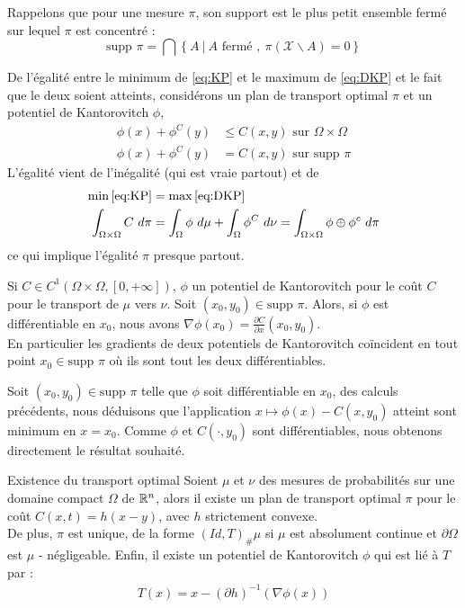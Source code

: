 \documentclass[a4paper,12pt]{article}
\newcommand{\supp}{\text{supp }}
\begin{document}
Rappelons que pour une mesure $\pi$, son support est le plus petit ensemble fermé sur lequel $\pi$ est concentré : 
$$
\supp \pi = \bigcap \left\{A\ |\ A \text{ fermé },\ \pi(\mathcal{X}\backslash A) = 0 \right\}
$$

De l'égalité entre le minimum de \eqref{eq:KP} et le maximum de \eqref{eq:DKP} et le fait que le deux soient atteints, considérons un plan de transport optimal $\pi$ et un potentiel de Kantorovitch $\phi$, 
\begin{align}
\phi(x)+\phi^C(y) &\leq C(x,y) \text{ sur } \Omega\times\Omega \\
\phi(x)+\phi^C(y) &= C(x,y) \text{ sur }\supp\pi
\end{align}
L'égalité vient de l'inégalité (qui est vraie partout) et de 
\begin{align}
\min\eqref{eq:KP} &= \max \eqref{eq:DKP}\nonumber\\
\int_{\Omega\times\Omega} C\ d\pi &= \int_{\Omega}\phi\ d\mu +  \int_{\Omega} \phi^C\ d\nu = \int_{\Omega\times\Omega} \phi\oplus\phi^c\ d\pi
\end{align}
ce qui implique l'égalité $\pi$ presque partout. 

\begin{proposition}
Si $C\in C^1(\Omega\times\Omega,[0,+\infty])$, $\phi$ un potentiel de Kantorovitch pour le coût $C$ pour le transport de $\mu$ vers $\nu$. Soit $(x_0,y_0)\in\supp\pi$. Alors, si $\phi$ est différentiable en $x_0$, nous avons $\nabla\phi(x_0)= \frac{\partial C}{\partial x}(x_0,y_0)$.\\
En particulier les gradients de deux potentiels de Kantorovitch coïncident en tout point $x_0\in\supp\pi$ où ils sont tout les deux différentiables.
\end{proposition}
\begin{preuve}
Soit $(x_0,y_0)\in\supp\pi$ telle que $\phi$ soit différentiable en $x_0$, des calculs précédents, nous déduisons que l'application $x\mapsto\phi(x)-C(x,y_0)$ atteint sont minimum en $x=x_0$. 
Comme $\phi$ et $C(\cdot,y_0)$ sont différentiables, nous obtenons directement le résultat souhaité. 
\end{preuve}


\begin{theoreme}{Existence du transport optimal}
\label{thm:existtrasp}
Soient $\mu$ et $\nu$ des mesures de probabilités sur une domaine compact $\Omega$ de $\mathbb{R}^n$, alors il existe un plan de transport optimal $\pi$ pour le coût $C(x,t) = h(x-y)$, avec $h$ strictement convexe. \\
De plus, $\pi$ est unique, de la forme $(Id,T)_{\#}\mu$ si $\mu$ est absolument continue et $\partial\Omega$ est $\mu$ - négligeable. Enfin, il existe un potentiel de Kantorovitch $\phi$ qui est lié à $T$ par :
\begin{align}
T(x) = x- (\partial h)^{-1}(\nabla\phi(x))
\end{align}
\end{theoreme}
\end{document}
